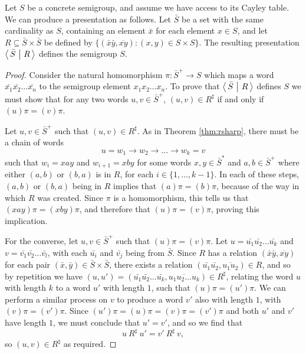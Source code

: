 \begin{method}
  \label{meth:trivial-presentation}
  Let $S$ be a concrete semigroup, and assume we have access to its Cayley
  table.  We can produce a presentation as follows.  Let $\bar S$ be a set with
  the same cardinality as $S$, containing an element $\bar{x}$ for each element
  $x \in S$, and let $R \subseteq \bar{S} \times \bar{S}$ be defined by
  $\{(\bar{x}\bar{y}, \overline{xy}) : (x,y) \in S \times S\}.$ The resulting
  presentation $\left\langle\,\bar{S} ~\middle|~ R\,\right\rangle$ defines the semigroup $S$.

  \begin{proof}
    Consider the natural homomorphism $\pi: \bar{S}^+ \to S$ which maps a word
    $\bar{x_1}\bar{x_2}\ldots \bar{x_n}$ to the semigroup element
    $x_1 x_2\ldots x_n$.  To prove that $\left\langle\,\bar{S} ~\middle|~ R\,\right\rangle$ defines $S$ we must
    show that for any two words $u, v \in \bar{S}^+$, $(u, v) \in R^\sharp$ if
    and only if $(u)\pi = (v)\pi$.

    Let $u,v \in \bar{S}^+$ such that $(u, v) \in R^\sharp$.  As in Theorem
    \ref{thm:rsharp}, there must be a chain of words
    $$u = w_1 \to w_2 \to \ldots \to w_k = v$$
    such that $w_i = xay$ and $w_{i+1} = xby$ for some words $x,y \in \bar{S}^*$ and
    $a,b \in \bar{S}^+$ where either $(a,b)$ or $(b,a)$ is in $R$, for each
    $i \in \{1, \ldots, k-1\}$.  In each of these steps, $(a,b)$ or $(b,a)$
    being in $R$ implies that $(a)\pi = (b)\pi$, because of the way in which $R$
    was created.  Since $\pi$ is a homomorphism, this tells us that
    $(xay)\pi = (xby)\pi$, and therefore that $(u)\pi = (v)\pi$, proving this
    implication.

    For the converse, let $u,v \in \bar{S}^+$ such that $(u)\pi = (v)\pi$.  Let
    $u = \bar{u_1}\bar{u_2}\ldots \bar{u_k}$ and $v = \bar{v_1}\bar{v_2}\ldots \bar{v_l}$, with each $\bar{u_i}$ and $\bar{v_j}$
    being from $\bar{S}$.  Since $R$ has a relation $(\bar{x}\bar{y}, \overline{xy})$ for each
    pair $(\bar{x},\bar{y}) \in \bar{S} \times \bar{S}$, there exists a relation
    $(\bar{u_1}\bar{u_2}, \overline{u_1u_2}) \in R$, and so by repetition we have
    $(u, u') = (\bar{u_1}\bar{u_2}\ldots \bar{u_k}, \overline{u_1u_2\ldots u_k}) \in R^\sharp$, relating the
    word $u$ with length $k$ to a word $u'$ with length $1$, such that
    $(u)\pi = (u')\pi$.  We can perform
    a similar process on $v$ to produce a word $v'$ also with length $1$, with
    $(v)\pi = (v')\pi$.
    Since $(u')\pi = (u)\pi = (v)\pi = (v')\pi$ and both $u'$ and $v'$
    have length $1$, we must conclude that $u' = v'$, and so we
    find that
    $$u ~R^\sharp~ u' = v' ~R^\sharp~ v,$$
    so $(u,v) \in R^\sharp$ as required.
  \end{proof}
\end{method}

